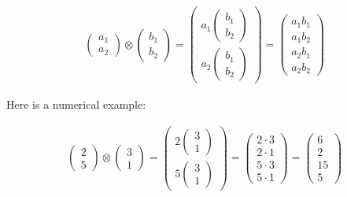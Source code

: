 \documentclass[11pt]{article}
\begin{document}
\begin{align}
\begin{pmatrix}
a_1 \\ a_2
\end{pmatrix} \otimes
\begin{pmatrix}
b_1 \\ b_2
\end{pmatrix} = 
\begin{pmatrix}
a_1 \begin{pmatrix}
b_1 \\ b_2
\end{pmatrix} \\ a_2 \begin{pmatrix}
b_1 \\ b_2
\end{pmatrix}
\end{pmatrix} = 
\begin{pmatrix}
a_1b_1 \\ a_1b_2 \\ a_2b_1 \\ a_2b_2
\end{pmatrix}
\end{align}

    Here is a numerical example:

    \begin{align}
\begin{pmatrix}
2 \\ 5
\end{pmatrix} \otimes 
\begin{pmatrix}
3 \\ 1
\end{pmatrix} = 
\begin{pmatrix}
2 \begin{pmatrix}
3 \\ 1
\end{pmatrix} \\ 5 \begin{pmatrix}
3 \\ 1
\end{pmatrix}
\end{pmatrix} = 
\begin{pmatrix}
2 \cdot 3 \\ 2 \cdot 1 \\ 5 \cdot 3 \\ 5 \cdot 1
\end{pmatrix} = 
\begin{pmatrix}
6 \\ 2 \\ 15 \\ 5
\end{pmatrix}
\end{align}
\end{document}
